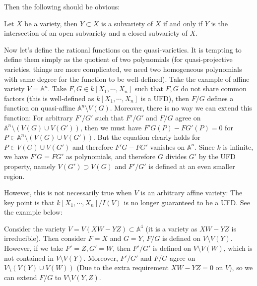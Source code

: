 \documentclass{note-eng}
\begin{document}
Then the following should be obvious:

\begin{proposition}\label{prop:subvariety-test}
    Let $X$ be a variety, then $Y \subset X$ is a subvariety of $X$ if and only if $Y$ is the intersection of an open subvariety and a closed subvariety of $X$.
\end{proposition}

\iffalse

\begin{proposition}
    Let $X$ be a quasi-affine (resp. quasi-projective) variety. Then $I(X) = I(\overline{X})$.
\end{proposition}

\begin{proof}
    Note that $I(X) = I(V(I(X))) = I(\overline{X})$.
\end{proof}

\fi

Now let's define the rational functions on the quasi-varieties. It is tempting to define them simply as the quotient of two polynomials (for quasi-projective varieties, things are more complicated, we need two homogeneous polynomials with same degree for the function to be well-defined). Take the example of affine variety $V = \mathbb{A}^n$. Take $F, G \in k[X_1, \cdots, X_n]$ such that $F, G$ do not share common factors (this is well-defined as $k[X_1, \cdots, X_n]$ is a UFD), then $F / G$ defines a function on quasi-affine $\mathbb{A}^n \setminus V(G)$. Moreover, there is no way we can extend this function: For arbitrary $F' / G'$ such that $F' / G'$ and $F / G$ agree on $\mathbb{A}^n \setminus (V(G) \cup V(G'))$, then we must have $F'G(P) - FG'(P) = 0$ for $P \in \mathbb{A}^n \setminus (V(G) \cup V(G'))$. But the equation clearly holds for $P \in V(G) \cup V(G')$ and therefore $F'G - FG'$ vanishes on $\mathbb{A}^n$. Since $k$ is infinite, we have $F'G = FG'$ as polynomials, and therefore $G$ divides $G'$ by the UFD property, namely $V(G') \supset V(G)$ and $F' / G'$ is defined at an even smaller region.

However, this is not necessarily true when $V$ is an arbitrary affine variety: The key point is that $k[X_1, \cdots, X_n] / I(V)$ is no longer guaranteed to be a UFD. See the example below:

\begin{example}
    Consider the variety $V = V(XW - YZ) \subset \mathbb{A}^4$ (it is a variety as $XW - YZ$ is irreducible). Then consider $F = X$ and $G = Y$, $F / G$ is defined on $V \setminus V(Y)$. However, if we take $F' = Z, G' = W$, then $F' / G'$ is defined on $V \setminus V(W)$, which is not contained in $V \setminus V(Y)$. Moreover, $F' / G'$ and $F / G$ agree on $V \setminus (V(Y) \cup V(W))$ (Due to the extra requirement $XW - YZ = 0$ on $V$), so we can extend $F / G$ to $V \setminus V(Y, Z)$.
\end{example}
\end{document}
